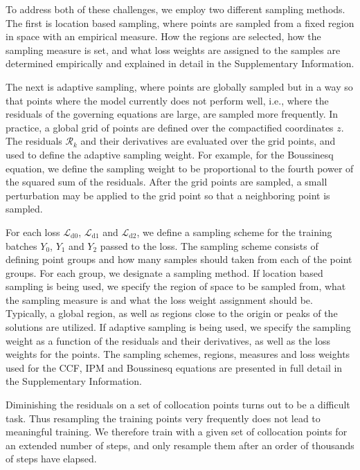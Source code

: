 \documentclass[fleqn,11pt]{wlscirep}
\begin{document}
To address both of these challenges, we employ two different sampling methods. The first is location based sampling, where points are sampled from a fixed region in space with an empirical measure. How the regions are selected, how the sampling measure is set, and what loss weights are assigned to the samples are determined empirically and explained in detail in the Supplementary Information.

The next is adaptive sampling, where points are globally sampled but in a way so that points where the model currently does not perform well, i.e., where the residuals of the governing equations are large, are sampled more frequently. In practice, a global grid of points are defined over the compactified coordinates $z$. The residuals $\mathcal{R}_k$ and their derivatives are evaluated over the grid points, and used to define the adaptive sampling weight. For example, for the Boussinesq equation, we define the sampling weight to be proportional to the fourth power of the squared sum of the residuals. After the grid points are sampled, a small perturbation may be applied to the grid point so that a neighboring point is sampled.

For each loss $\mathcal{L}_\text{d0}$, $\mathcal{L}_\text{d1}$ and $\mathcal{L}_\text{d2}$, we define a sampling scheme for the training batches $Y_0$, $Y_1$ and $Y_2$ passed to the loss. The sampling scheme consists of defining point groups and how many samples should taken from each of the point groups. For each group, we designate a sampling method. If location based sampling is being used, we specify the region of space to be sampled from, what the sampling measure is and what the loss weight assignment should be. Typically, a global region, as well as regions close to the origin or peaks of the solutions are utilized. If adaptive sampling is being used, we specify the sampling weight as a function of the residuals and their derivatives, as well as the loss weights for the points. The sampling schemes, regions, measures and loss weights used for the CCF, IPM and Boussinesq equations are presented in full detail in the Supplementary Information.

Diminishing the residuals on a set of collocation points turns out to be a difficult task. Thus resampling the training points very frequently does not lead to meaningful training. We therefore train with a given set of collocation points for an extended number of steps, and only resample them after an order of thousands of steps have elapsed.
\end{document}
